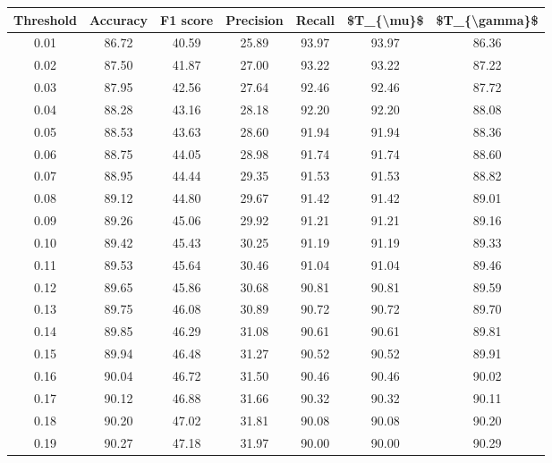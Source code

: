 \begin{tabular}{|c|c|c|c|c|c|c|}
\hline
 Threshold &  Accuracy &  F1 score &  Precision &  Recall &  \$T\_\{\textbackslash mu\}\$ &  \$T\_\{\textbackslash gamma\}\$ \\
\hline
      0.01 &     86.72 &     40.59 &      25.89 &   93.97 &      93.97 &         86.36 \\
      0.02 &     87.50 &     41.87 &      27.00 &   93.22 &      93.22 &         87.22 \\
      0.03 &     87.95 &     42.56 &      27.64 &   92.46 &      92.46 &         87.72 \\
      0.04 &     88.28 &     43.16 &      28.18 &   92.20 &      92.20 &         88.08 \\
      0.05 &     88.53 &     43.63 &      28.60 &   91.94 &      91.94 &         88.36 \\
      0.06 &     88.75 &     44.05 &      28.98 &   91.74 &      91.74 &         88.60 \\
      0.07 &     88.95 &     44.44 &      29.35 &   91.53 &      91.53 &         88.82 \\
      0.08 &     89.12 &     44.80 &      29.67 &   91.42 &      91.42 &         89.01 \\
      0.09 &     89.26 &     45.06 &      29.92 &   91.21 &      91.21 &         89.16 \\
      0.10 &     89.42 &     45.43 &      30.25 &   91.19 &      91.19 &         89.33 \\
      0.11 &     89.53 &     45.64 &      30.46 &   91.04 &      91.04 &         89.46 \\
      0.12 &     89.65 &     45.86 &      30.68 &   90.81 &      90.81 &         89.59 \\
      0.13 &     89.75 &     46.08 &      30.89 &   90.72 &      90.72 &         89.70 \\
      0.14 &     89.85 &     46.29 &      31.08 &   90.61 &      90.61 &         89.81 \\
      0.15 &     89.94 &     46.48 &      31.27 &   90.52 &      90.52 &         89.91 \\
      0.16 &     90.04 &     46.72 &      31.50 &   90.46 &      90.46 &         90.02 \\
      0.17 &     90.12 &     46.88 &      31.66 &   90.32 &      90.32 &         90.11 \\
      0.18 &     90.20 &     47.02 &      31.81 &   90.08 &      90.08 &         90.20 \\
      0.19 &     90.27 &     47.18 &      31.97 &   90.00 &      90.00 &         90.29 \\

\end{tabular}
